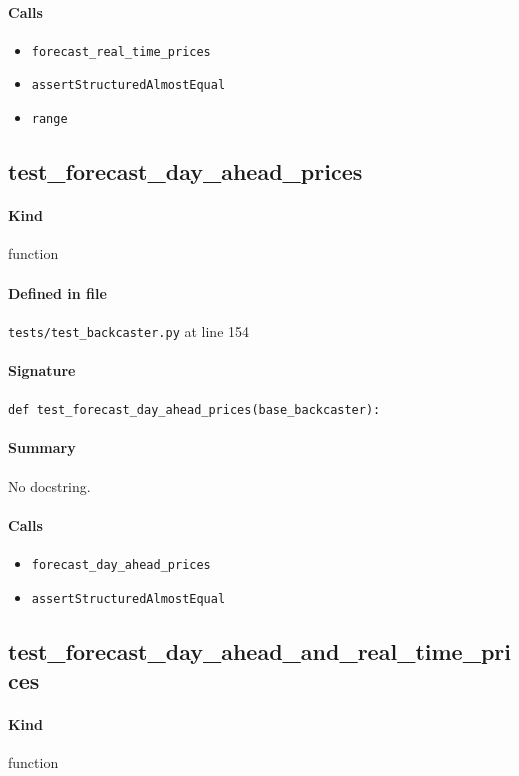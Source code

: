 \documentclass[11pt]{report}
\begin{document}
\paragraph{Calls}
\begin{itemize}[leftmargin=*]
  \item \texttt{forecast\_real\_time\_prices}
  \item \texttt{assertStructuredAlmostEqual}
  \item \texttt{range}
\end{itemize}
\subsection{test\_forecast\_day\_ahead\_prices}
\label{def:tests-test_backcaster.py:test_forecast_day_ahead_prices:L154}
\paragraph{Kind} function
\paragraph{Defined in file} \texttt{tests/test\_backcaster.py} at line 154
\paragraph{Signature} \texttt{def test\_forecast\_day\_ahead\_prices(base\_backcaster):}
\paragraph{Summary} No docstring.
\paragraph{Calls}
\begin{itemize}[leftmargin=*]
  \item \texttt{forecast\_day\_ahead\_prices}
  \item \texttt{assertStructuredAlmostEqual}
\end{itemize}
\subsection{test\_forecast\_day\_ahead\_and\_real\_time\_prices}
\label{def:tests-test_backcaster.py:test_forecast_day_ahead_and_real_time_prices:L170}
\paragraph{Kind} function
\end{document}
